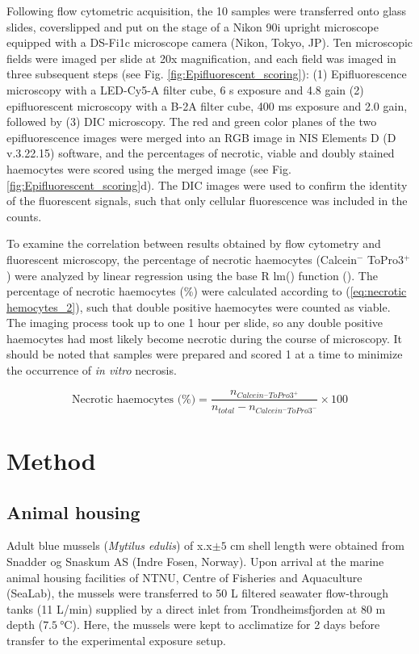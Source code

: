 Following flow cytometric acquisition, the 10 samples were transferred onto glass slides, coverslipped and put on the stage of a Nikon 90i upright microscope equipped with a DS-Fi1c microscope camera (Nikon, Tokyo, JP). Ten microscopic fields were imaged per slide at 20x magnification, and each field was imaged in three subsequent steps (see Fig. \ref{fig:Epifluorescent_scoring}): (1) Epifluorescence microscopy with a LED-Cy5-A filter cube, 6 s exposure and 4.8 gain (2) epifluorescent microscopy with a B-2A filter cube, 400 ms exposure and 2.0 gain, followed by (3) DIC microscopy. The red and green color planes of the two epifluorescence images were merged into an RGB image in NIS Elements D (D v.3.22.15) software, and the percentages of necrotic, viable and doubly stained haemocytes were scored using the merged image (see Fig. \ref{fig:Epifluorescent_scoring}d). The DIC images were used to confirm the identity of the fluorescent signals, such that only cellular fluorescence was included in the counts.

To examine the correlation between results obtained by flow cytometry and fluorescent microscopy, the percentage of necrotic haemocytes (Calcein$^{-}$ ToPro3$^{+}$) were analyzed by linear regression using the base R lm() function (\cite{R-project}). The percentage of necrotic haemocytes (\%) were calculated according to (\ref{eq:necrotic hemocytes_2}), such that double positive haemocytes were counted as viable. The imaging process took up to one 1 hour per slide, so any double positive haemocytes had most likely become necrotic during the course of microscopy. It should be noted that samples were prepared and scored 1 at a time to minimize the occurrence of \emph{in vitro} necrosis.

\begin{equation}
    \label{eq:necrotic hemocytes_2}
    \text{Necrotic haemocytes (\%)} = \dfrac{n_{Calcein^{-}ToPro3^{+}}}{n_{total} - n_{Calcein^{-}ToPro3^{-}}} \times 100
\end{equation}

\section{Method}
\subsection{Animal housing}
Adult blue mussels (\emph{Mytilus edulis}) of x.x$\pm{5}$ cm shell length were obtained from Snadder og Snaskum AS (Indre Fosen, Norway). Upon arrival at the marine animal housing facilities of NTNU, Centre of Fisheries and Aquaculture (SeaLab), the mussels were transferred to 50 L filtered seawater flow-through tanks (11 L/min) supplied by a direct inlet from Trondheimsfjorden at 80 m depth ($\SI{7.5}{\celsius}$). Here, the mussels were kept to acclimatize for 2 days before transfer to the experimental exposure setup.

